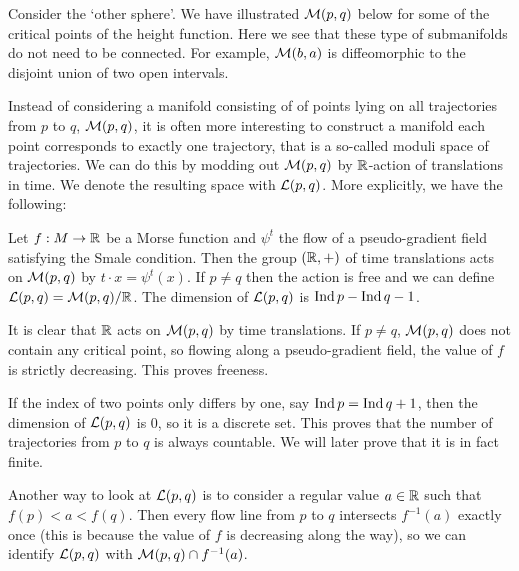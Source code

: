 \begin{eg}
    Consider the `other sphere'. 
    We have illustrated $\mathcal M(p, q)$ below for some of the critical points of the height function.
    Here we see that these type of submanifolds do not need to be connected. For example, $\mathcal M(b, a)$ is diffeomorphic to the disjoint union of two open intervals.
\end{eg}
\begin{figure}[H]
    \centering
\end{figure}

Instead of considering a manifold consisting of of points lying on all trajectories from $p$ to $q$, $\mathcal M(p, q)$, it is often more interesting to construct a manifold each point corresponds to exactly one trajectory, that is a so-called moduli space of trajectories.
We can do this by modding out $\mathcal M(p, q)$ by $\mathbb{R}$-action of translations in time. We denote the resulting space with $\mathcal L(p, q)$.
More explicitly, we have the following:

\begin{prop}
    Let $f: M \to  \mathbb{R}$ be a Morse function and $\psi^{t}$ the flow of a pseudo-gradient field satisfying the Smale condition.
    Then the group $(\mathbb{R}, +)$ of time translations acts on $\mathcal M(p, q)$ by  $t \cdot x = \psi^{t}(x)$.  If $p \neq q$ then the action is free and we can define $ \mathcal L(p, q) = \mathcal M(p, q) / \mathbb{R} $. The dimension of $\mathcal L(p, q)$ is $\operatorname{Ind} p - \operatorname{Ind} q - 1$.
\end{prop}
\begin{myproof}
    It is clear that $\mathbb{R}$ acts on $\mathcal M(p, q)$ by time translations. 
    If $p \neq q$,  $\mathcal M(p, q)$ does not contain any critical point, so flowing along a pseudo-gradient field, the value of $f$ is strictly decreasing. This proves freeness.
\end{myproof}

\begin{remark}
    If the index of two points only differs by one, say $\operatorname{Ind} p = \operatorname{Ind} q + 1$, then the dimension of $\mathcal L(p, q)$ is $0$, so it is a discrete set.
    This proves that the number of trajectories from $p$ to $q$ is always countable.
    We will later prove that it is in fact finite.
    \label{remark:trajectories-finite}
\end{remark}
\begin{remark}
    Another way to look at $\mathcal L(p, q)$ is to consider a regular value $a \in \mathbb{R}$ such that $f(p)<a<f(q)$. Then every flow line from $p$ to $q$  intersects $f^{-1}(a)$ exactly once (this is because the value of $f$ is decreasing along the way), so we can identify  $\mathcal L(p, q)$ with  $\mathcal M(p, q) \cap f^{-1}(a)$.
\end{remark}


